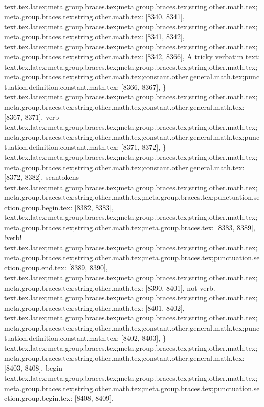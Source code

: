 {{{{{{{{{{{{{{{{{{{{{{{{{{{{{{{{{{{{{{{{{{{{{{{{{{{{{{{{{{{{{{{{{{{{{{{{{{{{{{{{{{{{{{{{{{{{{{{{{{{{{{{{{{{{{{{{{{{{{{{{{{{{{{{{{{{{{{{{{{{{{{{{{{{{{{{{{{{{{{{{{{{{{{{{{{{{{{{{{{{{{{{{{{{{{{{{{{{{{{{{{{{{{{{{{{{{{{{{{{{{{{{{{{{{{{{{{{{{{{{{{text.tex.latex;meta.group.braces.tex;meta.group.braces.tex;string.other.math.tex;meta.group.braces.tex;string.other.math.tex: [8340, 8341], {
}
text.tex.latex;meta.group.braces.tex;meta.group.braces.tex;string.other.math.tex;meta.group.braces.tex;string.other.math.tex: [8341, 8342], {
}
text.tex.latex;meta.group.braces.tex;meta.group.braces.tex;string.other.math.tex;meta.group.braces.tex;string.other.math.tex: [8342, 8366], {A tricky verbatim text: }
text.tex.latex;meta.group.braces.tex;meta.group.braces.tex;string.other.math.tex;meta.group.braces.tex;string.other.math.tex;constant.other.general.math.tex;punctuation.definition.constant.math.tex: [8366, 8367], {\}
text.tex.latex;meta.group.braces.tex;meta.group.braces.tex;string.other.math.tex;meta.group.braces.tex;string.other.math.tex;constant.other.general.math.tex: [8367, 8371], {verb}
text.tex.latex;meta.group.braces.tex;meta.group.braces.tex;string.other.math.tex;meta.group.braces.tex;string.other.math.tex;constant.other.general.math.tex;punctuation.definition.constant.math.tex: [8371, 8372], {\}
text.tex.latex;meta.group.braces.tex;meta.group.braces.tex;string.other.math.tex;meta.group.braces.tex;string.other.math.tex;constant.other.general.math.tex: [8372, 8382], {scantokens}
text.tex.latex;meta.group.braces.tex;meta.group.braces.tex;string.other.math.tex;meta.group.braces.tex;string.other.math.tex;meta.group.braces.tex;punctuation.section.group.begin.tex: [8382, 8383], {{}
text.tex.latex;meta.group.braces.tex;meta.group.braces.tex;string.other.math.tex;meta.group.braces.tex;string.other.math.tex;meta.group.braces.tex: [8383, 8389], {!verb!}
text.tex.latex;meta.group.braces.tex;meta.group.braces.tex;string.other.math.tex;meta.group.braces.tex;string.other.math.tex;meta.group.braces.tex;punctuation.section.group.end.tex: [8389, 8390], {}}
text.tex.latex;meta.group.braces.tex;meta.group.braces.tex;string.other.math.tex;meta.group.braces.tex;string.other.math.tex: [8390, 8401], { not verb.
}
text.tex.latex;meta.group.braces.tex;meta.group.braces.tex;string.other.math.tex;meta.group.braces.tex;string.other.math.tex: [8401, 8402], {
}
text.tex.latex;meta.group.braces.tex;meta.group.braces.tex;string.other.math.tex;meta.group.braces.tex;string.other.math.tex;constant.other.general.math.tex;punctuation.definition.constant.math.tex: [8402, 8403], {\}
text.tex.latex;meta.group.braces.tex;meta.group.braces.tex;string.other.math.tex;meta.group.braces.tex;string.other.math.tex;constant.other.general.math.tex: [8403, 8408], {begin}
text.tex.latex;meta.group.braces.tex;meta.group.braces.tex;string.other.math.tex;meta.group.braces.tex;string.other.math.tex;meta.group.braces.tex;punctuation.section.group.begin.tex: [8408, 8409], {{}
}}}}}}}}}}}}}}}}}}}}}}}}}}}}}}}}}}}}}}}}}}}}}}}}}}}}}}}}}}}}}}}}}}}}}}}}}}}}}}}}}}}}}}}}}}}}}}}}}}}}}}}}}}}}}}}}}}}}}}}}}}}}}}}}}}}}}}}}}}}}}}}}}}}}}}}}}}}}}}}}}}}}}}}}}}}}}}}}}}}}}}}}}}}}}}}}}}}}}}}}}}}}}}}}}}}}}}}}}}}}}}}}}}}}}}}}}}}}}}}}}}}}}
